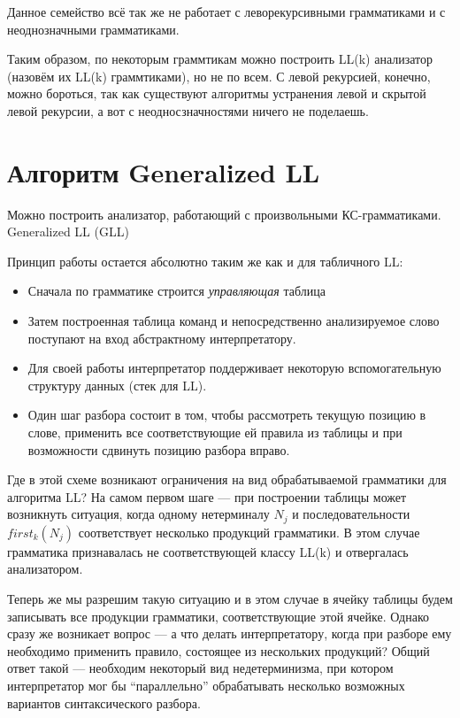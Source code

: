 Данное семейство всё так же не работает с леворекурсивными грамматиками и с неоднозначными грамматиками.

Таким образом, по некоторым граммтикам можно построить LL(k) анализатор (назовём их LL(k) граммтиками), но не по всем.
С левой рекурсией, конечно, можно бороться, так как существуют алгоритмы устранения левой и скрытой левой рекурсии, а вот с неодносзначностями ничего не поделаешь.



\section{Алгоритм Generalized LL}

Можно построить анализатор, работающий с произвольными КС-грамматиками.
Generalized LL (GLL)~\cite{Scott:2010:GP:1860132.1860320,10.1007/978-3-662-46663-6_5}

Принцип работы остается абсолютно таким же как и для табличного LL: 
\begin{itemize}
  \item Сначала по грамматике строится \textit{управляющая} таблица
  \item Затем построенная таблица команд и непосредственно анализируемое слово поступают на вход абстрактному интерпретатору.
  \item Для своей работы интерпретатор поддерживает некоторую вспомогательную структуру данных (стек для LL).
  \item Один шаг разбора состоит в том, чтобы рассмотреть текущую позицию в слове, применить все соответствующие ей правила из таблицы и при возможности сдвинуть позицию разбора вправо.
\end{itemize}

Где в этой схеме возникают ограничения на вид обрабатываемой грамматики для алгоритма LL? На самом первом шаге --- при построении таблицы может возникнуть ситуация, когда одному нетерминалу $N_j$ и последовательности $first_k(N_j)$ соответствует несколько продукций грамматики. В этом случае грамматика признавалась не соответствующей классу LL(k) и отвергалась анализатором.

Теперь же мы разрешим такую ситуацию и в этом случае в ячейку таблицы будем записывать все продукции грамматики, соответствующие этой ячейке. Однако сразу же возникает вопрос --- а что делать интерпретатору, когда при разборе ему необходимо применить правило, состоящее из нескольких продукций? Общий ответ такой --- необходим некоторый вид недетерминизма, при котором интерпретатор мог бы ``параллельно'' обрабатывать несколько возможных вариантов синтаксического разбора.

